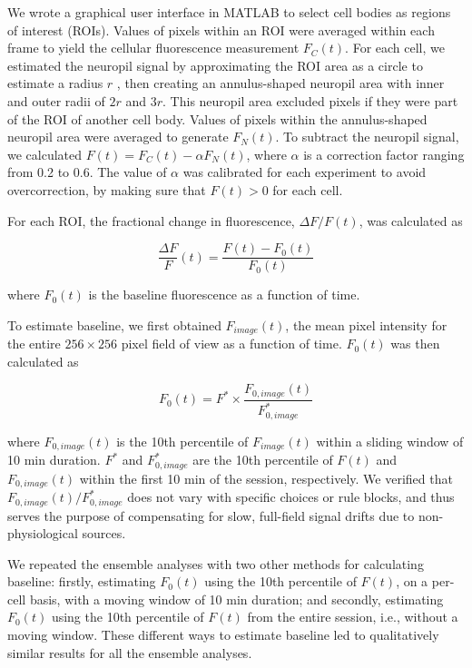 We wrote a graphical user interface in MATLAB to select cell bodies as regions of interest (ROIs). Values of pixels within an ROI were averaged within each frame to yield the cellular fluorescence measurement $F_C(t)$. For each cell, we estimated the neuropil signal by approximating the ROI area as a circle to estimate a radius $r$ \citep{peron2015cellular}, then creating an annulus-shaped neuropil area with inner and outer radii of $2r$ and $3r$. This neuropil area excluded pixels if they were part of the ROI of another cell body. Values of pixels within the annulus-shaped neuropil area were averaged to generate $F_N(t)$. To subtract the neuropil signal, we calculated $F(t) = F_C(t) - \alpha F_N(t)$, where $\alpha$ is a correction factor ranging from 0.2 to 0.6. The value of $\alpha$ was calibrated for each experiment to avoid overcorrection, by making sure that $F(t) > 0$ for each cell. 

For each ROI, the fractional change in fluorescence, $\Delta F/F (t)$, was calculated as

\begin{equation*}
    \frac{\Delta F}{F}(t) = \frac{F(t)-F_0(t)}{F_0(t)}
\end{equation*}

\noindent where $F_0(t)$ is the baseline fluorescence as a function of time. 

To estimate baseline, we first obtained $F_{image}(t)$, the mean pixel intensity for the entire $256 \times 256$ pixel field of view as a function of time. $F_0(t)$ was then calculated as

\begin{equation*}
    F_0(t) = F^{*} \times \frac{F_{0,image}(t)}{F^*_{0,image}}
\end{equation*}

\noindent where $F_{0,image}(t)$ is the 10th percentile of $F_{image}(t)$ within a sliding window of 10 min duration. $F^*$ and $F^*_{0,image}$ are the 10th percentile of $F(t)$ and $F_{0,image}(t)$ within the first 10 min of the session, respectively. We verified that $F_{0,image}(t)/F^*_{0,image}$ does not vary with specific choices or rule blocks, and thus serves the purpose of compensating for slow, full-field signal drifts due to non-physiological sources. 

We repeated the ensemble analyses with two other methods for calculating baseline: firstly, estimating $F_0(t)$ using the 10th percentile of $F(t)$, on a per-cell basis, with a moving window of 10 min duration; and secondly, estimating $F_0(t)$ using the 10th percentile of $F(t)$ from the entire session, i.e., without a moving window. These different ways to estimate baseline led to qualitatively similar results for all the ensemble analyses.

